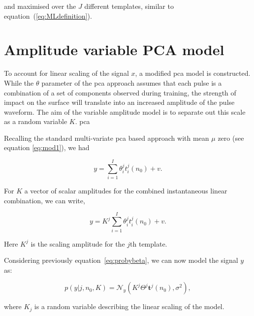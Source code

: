 and maximised over the $J$ different templates, similar to equation~(\ref{eq:MLdefinition}).

\section{Amplitude variable PCA model}\label{sec:KamplitudeModel}

To account for linear scaling of the signal $x$, a modified \DIFdelbegin {}\DIFdelend \DIFaddbegin \gls{pca} \DIFaddend model is constructed. While the $\theta$ parameter of the \DIFdelbegin {}\DIFdelend \DIFaddbegin \gls{pca} \DIFaddend approach assumes that each pulse is a combination of a set of components observed during training, the strength of impact on the surface will translate into an increased amplitude of the pulse waveform. The aim of the variable amplitude model is to separate out this scale as a random variable $K$. \DIFaddbegin {}\gls{pca} \DIFaddend

Recalling the standard multi-variate \DIFdelbegin {}\DIFdelend \DIFaddbegin \gls{pca} \DIFaddend based approach with mean $\mu$ zero (see equation \ref{eq:mod1}), we had

\begin{equation}\label{eq:K_PCAmodel}
y = \sum^I_{i=1} \theta^j_i t^j_i(n_0) + v.
\end{equation}

For $K$ a vector of scalar amplitudes for the combined instantaneous linear combination, we can write,

\begin{equation}\label{eq:Kmodel}
y = K^j \sum^I_{i=1} \theta^j_i t^j_i(n_0) + v.
\end{equation}

Here $K^j$ is the scaling amplitude for the $j$th template.

Considering previously equation~\ref{eq:probybeta}, we can now model the signal $y$ as:

\begin{equation}\label{eq:GP2}
    p(y|j,n_0,K) = \mathcal{N}_y(K^j \Theta^j \textbf{t}^j(n_0) , \sigma^2),
\end{equation}

where $K_j$ is a random variable describing the linear scaling of the model.

